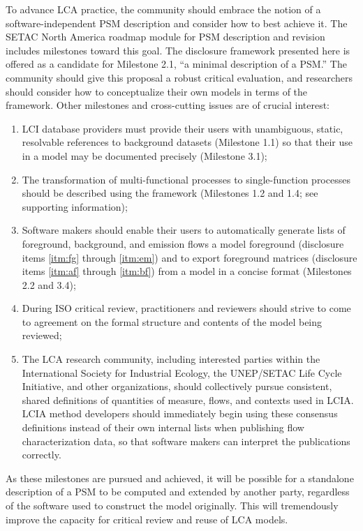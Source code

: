 To advance LCA practice, the community should embrace the notion of a software-independent PSM description and consider how to best achieve it.  The SETAC North America roadmap module for PSM description and revision \citep{Kuczenski_JLCA_2018} includes milestones toward this goal.  The disclosure framework presented here is offered as a candidate for Milestone 2.1, ``a minimal description of a PSM.''  The community should give this proposal a robust critical evaluation, and researchers should consider how to conceptualize their own models in terms of the framework.  Other milestones and cross-cutting issues are of crucial interest:
\begin{enumerate}[label=(\alph*)]
\item LCI database providers must provide their users with unambiguous, static, resolvable references to background datasets (Milestone 1.1) so that their use in a model may be documented precisely (Milestone 3.1);
\item The transformation of multi-functional processes to single-function processes should be described using the framework (Milestones 1.2 and 1.4; see supporting information);
\item Software makers should enable their users to automatically generate lists of foreground, background, and emission flows a model foreground (disclosure items \ref{itm:fg} through \ref{itm:em}) and to export foreground matrices (disclosure items \ref{itm:af} through \ref{itm:bf}) from a model in a concise format (Milestones 2.2 and 3.4);
\item During ISO critical review, practitioners and reviewers should strive to come to agreement on the formal structure and contents of the model being reviewed;
\item The LCA research community, including interested parties within the International Society for Industrial Ecology, the UNEP/SETAC Life Cycle Initiative, and other organizations, should collectively pursue consistent, shared definitions of quantities of measure, flows, and contexts used in LCIA.  %
LCIA method developers should immediately begin using these consensus definitions instead of their own internal lists when publishing flow characterization data, so that software makers can interpret the publications correctly.  %
\end{enumerate}
As these milestones are pursued and achieved, it will be possible for a standalone description of a PSM to be computed and extended by another party, regardless of the software used to construct the model originally.  This will tremendously improve the capacity for critical review and reuse of LCA models.

